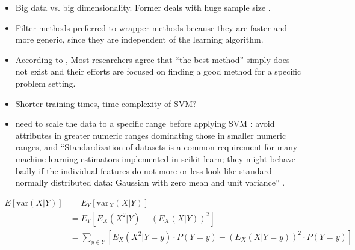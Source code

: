 \documentclass[12pt, twoside, a4paper]{article}
\begin{document}
\begin{itemize}
    \item Big data vs. big dimensionality. Former deals with huge sample size \cite{RefWorks:163}.
    
    \item Filter methods preferred to wrapper methods because they are faster and more generic, since they are independent of the learning algorithm.
    
    \item According to \cite{RefWorks:163}, Most researchers agree that ``the best method'' simply does not exist and their efforts are
focused on finding a good method for a specific problem setting.

    \item Shorter training times, time complexity of SVM?
    
    \item need to scale the data to a specific range before applying SVM \cite{RefWorks:128}: avoid attributes in greater numeric
ranges dominating those in smaller numeric ranges, and ``Standardization of datasets is a common requirement for many machine learning estimators implemented in scikit-learn; they might behave badly if the individual features do not more or less look like standard normally distributed data: Gaussian with zero mean and unit variance'' \cite{scikit-learn}.
    
\end{itemize}

\begin{align*}
E\left[ \text{var} (X|Y) \right]
&= E_Y \left[ \text{var}_X (X|Y) \right] \\
&= E_Y \left[ E_X (X^2|Y) - \left( E_X(X|Y) \right)^2 \right] \\
&= \sum_{y \in Y} \left[ E_X \left( X^2 | Y=y \right) \cdot P(Y=y) - \left( E_X (X|Y=y) \right)^2 \cdot P(Y=y) \right]
\end{align*}





\newpage




\end{document}
